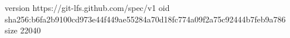 version https://git-lfs.github.com/spec/v1
oid sha256:b6fa2b9100cd973e44f449ae55284a70d18fc774a09f2a75c92444b7feb9a786
size 22040
